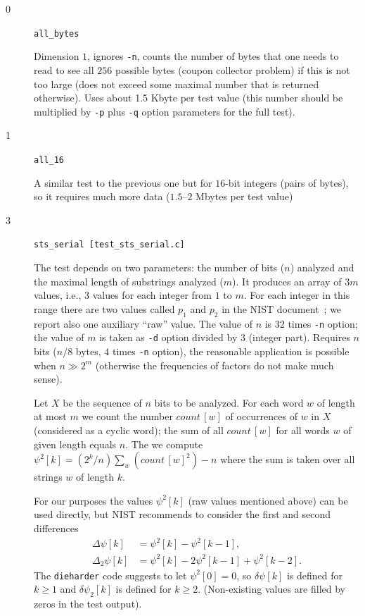 \documentclass[12pt,a4paper,fullpage]{article}
\begin{document}
\begin{description}

\item[0] \texttt{all\_bytes}

Dimension $1$, ignores \texttt{-n}, counts the number of bytes that one needs to read to see all $256$ possible bytes (coupon collector problem) if this is not too large (does not exceed some maximal number that is returned otherwise). Uses about 1.5 Kbyte per test value (this number should be multiplied by \texttt{-p} plus \texttt{-q} option parameters for the full test).

\item[1] \texttt{all\_16}

A similar test to the previous one but for $16$-bit integers (pairs of bytes), so it requires much more data ($1.5$--$2$ Mbytes per test value)

\item[3] \texttt{sts\_serial [test\_sts\_serial.c]}

The test depends on two parameters: the number of bits ($n$) analyzed and the maximal length of substrings analyzed ($m$). It produces an array of $3m$ values, i.e., $3$ values for each  integer from $1$ to $m$. For each integer in this range there are two values called $p_1$ and $p_2$ in the NIST document~\cite{nistsp800-22-1a}; we report also one auxiliary ``raw'' value. The value of $n$ is 32 times \texttt{-n} option; the value of $m$ is taken as \texttt{-d} option divided by $3$ (integer part). Requires $n$ bits ($n/8$ bytes, $4$ times \texttt{-n} option), the reasonable application is possible when $n\gg 2^m$ (otherwise the frequencies of factors do not make much sense). 

Let $X$ be the sequence of $n$ bits to be analyzed. For each word $w$ of length at most $m$ we count the number $\textit{count}\,[w]$ of occurrences of $w$ in $X$ (considered as a cyclic word); the sum of all $\textit{count}\,[w]$ for all words $w$ of given length equals $n$. The we compute $\psi^2[k] = (2^{k}/n)\sum_w (\textit{count}\,[w]^2) - n$ where the sum is taken over all strings $w$ of length $k$.
 
For our purposes the values $\psi^2[k]$ (raw values mentioned above) can be used directly, but NIST
 recommends to consider the first and second differences
\begin{align*}
   \Delta\psi[k] &= \psi^2[k] - \psi^2[k-1],\\
   \Delta_2\psi[k] &= \psi^2[k] - 2\psi^2[k-1] + \psi^2[k-2].
\end{align*}   
The \texttt{dieharder} code suggests to let $\psi^2[0]=0$, so $\delta\psi[k]$ is defined for $k\ge1$ and $\delta\psi_2[k]$ is defined for $k\ge2$. (Non-existing values are filled by zeros in the test output).  
 

\end{description}
\end{document}
